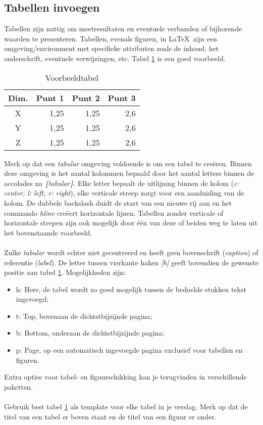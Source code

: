 \subsection{Tabellen invoegen}
Tabellen zijn nuttig om meetresultaten en eventuele verbanden of bijhorende waarden te presenteren. Tabellen, evenals figuren, in \LaTeX\ zijn een omgeving/environment met specifieke attributen zoals de inhoud, het onderschrift, eventuele verwijzingen, etc. Tabel \ref{tab:ref_label} is een goed voorbeeld. 

\begin{table}[h]
    \centering
    \caption{Voorbeeldtabel}
    \begin{tabular}{c r r r}
        \hline
        Dim. & Punt 1 & Punt 2 & Punt 3 \\ \hline \hline
        X & 1,25 & 1,25 & 2,6 \\ \hline
        Y & 1,25 & 1,25 & 2,6 \\ \hline
        Z & 1,25 & 1,25 & 2,6 \\ \hline
    \end{tabular}
    \label{tab:ref_label}
\end{table}

\noindent Merk op dat een \textit{tabular} omgeving voldoende is om een tabel te creëren. Binnen deze omgeving is het aantal kolommen bepaald door het aantal letters binnen de accolades na \textit{\{tabular\}}. Elke letter bepaalt de uitlijning binnen de kolom (\textit{c: center, l: left, r: right}), elke verticale streep zorgt voor een aanduiding van de kolom. De dubbele backslash duidt de start van een nieuwe rij aan en het commando \textit{hline} creëert horizontale lijnen. Tabellen zonder verticale of horizontale strepen zijn ook mogelijk door één van deze of beiden weg te laten uit het bovenstaande voorbeeld.
\\ \\
Zulke \textit{tabular} wordt echter niet gecentreerd en heeft geen bovenschrift (\textit{caption}) of referentie (\textit{label}). De letter tussen vierkante haken \textit{[h]} geeft  bovendien de gewenste positie aan tabel \ref{tab:ref_label}. Mogelijkheden zijn:
\begin{itemize}
    \item h: Here, de tabel wordt zo goed mogelijk tussen de bedoelde stukken tekst ingevoegd;
    \item t: Top, bovenaan de dichtstbijzijnde pagina;
    \item b: Bottom, onderaan de dichtstbijzijnde pagina;
    \item p: Page, op een automatisch ingevoegde pagina exclusief voor tabellen en figuren.
\end{itemize}
Extra opties voor tabel- en figuurschikking kan je terugvinden in verschillende paketten.
\\ \\
Gebruik best tabel \ref{tab:ref_label} als template voor elke tabel in je verslag. Merk op dat de titel van een tabel er boven staat en de titel van een figuur er onder. 

